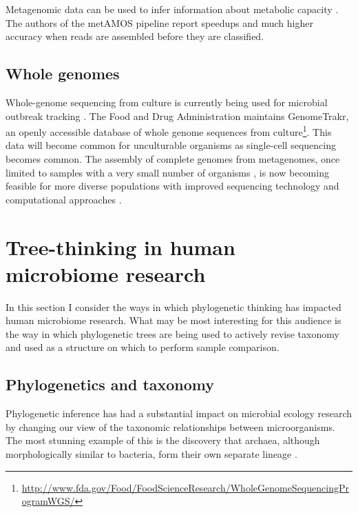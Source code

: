 \documentclass{amsart}
\begin{document}
Metagenomic data can be used to infer information about metabolic capacity \cite{greenblum2012metagenomic,abubucker2012metabolic}.
The authors of the metAMOS pipeline \citep{treangen2013metamos} report speedups and much higher accuracy when reads are assembled before they are classified.


\subsection{Whole genomes}
Whole-genome sequencing from culture is currently being used for microbial outbreak tracking \citep{koser2012rapid,snitkin2012tracking}.
The Food and Drug Administration maintains GenomeTrakr, an openly accessible database of whole genome sequences from culture\footnote{\url{http://www.fda.gov/Food/FoodScienceResearch/WholeGenomeSequencingProgramWGS/}}.
This data will become common for unculturable organisms as single-cell sequencing \citep[reviewed in][]{kalisky2011single} becomes common.
The assembly of complete genomes from metagenomes, once limited to samples with a very small number of organisms \citep{baker2010enigmatic}, is now becoming feasible for more diverse populations with improved sequencing technology and computational approaches \cite{howe2012assembling,pell2012scaling,iverson2012untangling,emerson2012metagenomic,podell2013assembly}.


\section{Tree-thinking in human microbiome research}

In this section I consider the ways in which phylogenetic thinking has impacted human microbiome research.
What may be most interesting for this audience is the way in which phylogenetic trees are being used to actively revise taxonomy and used as a structure on which to perform sample comparison.

\subsection{Phylogenetics and taxonomy}

Phylogenetic inference has had a substantial impact on microbial ecology research by changing our view of the taxonomic relationships between microorganisms.
The most stunning example of this is the discovery that archaea, although morphologically similar to bacteria, form their own separate lineage \citep{woese1977phylogenetic}.
\end{document}
